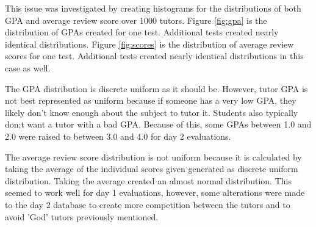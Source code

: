 This issue was investigated by creating histograms for the distributions
of both GPA and average review score over 1000 tutors. Figure \ref{fig:gpa} 
is the distribution of GPAs created for one test. Additional tests created nearly
identical distributions. Figure \ref{fig:scores} is the distribution of average
review scores for one test. Additional tests created nearly identical distributions
in this case as well. 

The GPA distribution is discrete uniform as it should be. However, tutor GPA is not
best represented as uniform because if someone has a very low GPA, they
likely don't know enough about the subject to tutor it. Students also typically don;t
want a tutor with a bad GPA. Because of this, some GPAs between 1.0 and 2.0 were 
raised to between 3.0 and 4.0 for day 2 evaluations. 

The average review score distribution is not uniform because it is calculated by
taking the average of the individual scores given generated as discrete uniform 
distribution. Taking the average created an almost normal distribution. This seemed
to work well for day 1 evaluations, however, some alterations were made to the day 2
database to create more competition between the tutors and to avoid 'God' tutors previously
mentioned.





